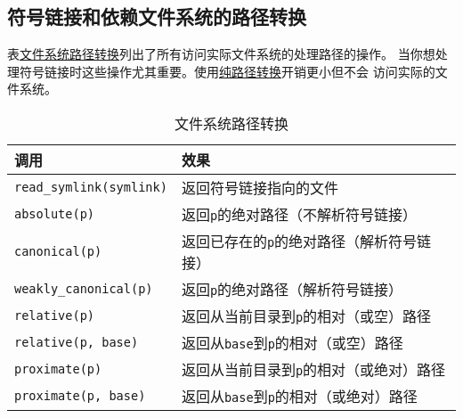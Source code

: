 \subsection{符号链接和依赖文件系统的路径转换}\label{ch20.4.5}
表\hyperref[t20.18]{文件系统路径转换}列出了所有访问实际文件系统的处理路径的操作。
当你想处理符号链接时这些操作尤其重要。使用\hyperref[ch20.3.3]{纯路径转换}开销更小但不会
访问实际的文件系统。
\begin{table}[htb]
    \centering
    \begin{tabular}{l|l}
        \hline
        \textbf{调用}                     & \textbf{效果}                           \\
        \hline
        \texttt{read\_symlink(symlink)} & 返回符号链接指向的文件                           \\
        \texttt{absolute(p)}            & 返回\texttt{p}的绝对路径（不解析符号链接）            \\
        \texttt{canonical(p)}           & 返回已存在的\texttt{p}的绝对路径（解析符号链接）         \\
        \texttt{weakly\_canonical(p)}   & 返回\texttt{p}的绝对路径（解析符号链接）             \\
        \texttt{relative(p)}            & 返回从当前目录到\texttt{p}的相对（或空）路径           \\
        \texttt{relative(p, base)}      & 返回从\texttt{base}到\texttt{p}的相对（或空）路径  \\
        \texttt{proximate(p)}           & 返回从当前目录到\texttt{p}的相对（或绝对）路径          \\
        \texttt{proximate(p, base)}     & 返回从\texttt{base}到\texttt{p}的相对（或绝对）路径 \\
        \hline
    \end{tabular}
    \caption{文件系统路径转换}
    \label{t20.18}
\end{table}

